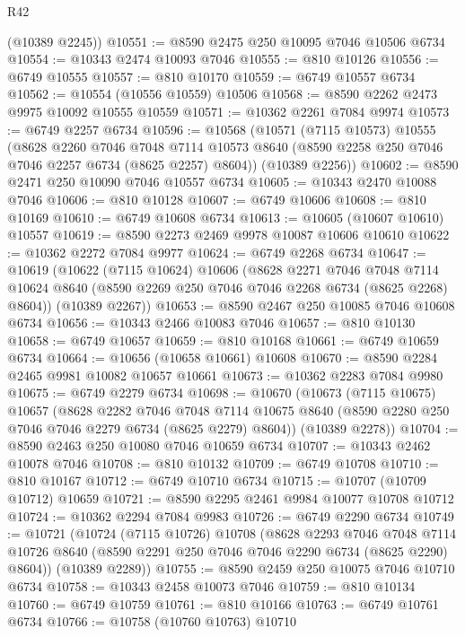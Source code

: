 \begin{lexlean}{R42}
\begin{coremodule}
{      (@10389 @2245))
@10551 := @8590 @2475 @250 @10095 @7046 @10506 @6734
@10554 := @10343 @2474 @10093 @7046
@10555 := @810 @10126
@10556 := @6749 @10555
@10557 := @810 @10170
@10559 := @6749 @10557 @6734
@10562 := @10554 (@10556 @10559) @10506
@10568 := @8590 @2262 @2473 @9975 @10092 @10555 @10559
@10571 := @10362 @2261 @7084 @9974
@10573 := @6749 @2257 @6734
@10596 := @10568
    (@10571
      (@7115 @10573)
      @10555
      (@8628
        @2260
        @7046
        @7048
        @7114
        @10573
        @8640
        (@8590 @2258 @250 @7046 @7046 @2257 @6734 (@8625 @2257) @8604))
      (@10389 @2256))
@10602 := @8590 @2471 @250 @10090 @7046 @10557 @6734
@10605 := @10343 @2470 @10088 @7046
@10606 := @810 @10128
@10607 := @6749 @10606
@10608 := @810 @10169
@10610 := @6749 @10608 @6734
@10613 := @10605 (@10607 @10610) @10557
@10619 := @8590 @2273 @2469 @9978 @10087 @10606 @10610
@10622 := @10362 @2272 @7084 @9977
@10624 := @6749 @2268 @6734
@10647 := @10619
    (@10622
      (@7115 @10624)
      @10606
      (@8628
        @2271
        @7046
        @7048
        @7114
        @10624
        @8640
        (@8590 @2269 @250 @7046 @7046 @2268 @6734 (@8625 @2268) @8604))
      (@10389 @2267))
@10653 := @8590 @2467 @250 @10085 @7046 @10608 @6734
@10656 := @10343 @2466 @10083 @7046
@10657 := @810 @10130
@10658 := @6749 @10657
@10659 := @810 @10168
@10661 := @6749 @10659 @6734
@10664 := @10656 (@10658 @10661) @10608
@10670 := @8590 @2284 @2465 @9981 @10082 @10657 @10661
@10673 := @10362 @2283 @7084 @9980
@10675 := @6749 @2279 @6734
@10698 := @10670
    (@10673
      (@7115 @10675)
      @10657
      (@8628
        @2282
        @7046
        @7048
        @7114
        @10675
        @8640
        (@8590 @2280 @250 @7046 @7046 @2279 @6734 (@8625 @2279) @8604))
      (@10389 @2278))
@10704 := @8590 @2463 @250 @10080 @7046 @10659 @6734
@10707 := @10343 @2462 @10078 @7046
@10708 := @810 @10132
@10709 := @6749 @10708
@10710 := @810 @10167
@10712 := @6749 @10710 @6734
@10715 := @10707 (@10709 @10712) @10659
@10721 := @8590 @2295 @2461 @9984 @10077 @10708 @10712
@10724 := @10362 @2294 @7084 @9983
@10726 := @6749 @2290 @6734
@10749 := @10721
    (@10724
      (@7115 @10726)
      @10708
      (@8628
        @2293
        @7046
        @7048
        @7114
        @10726
        @8640
        (@8590 @2291 @250 @7046 @7046 @2290 @6734 (@8625 @2290) @8604))
      (@10389 @2289))
@10755 := @8590 @2459 @250 @10075 @7046 @10710 @6734
@10758 := @10343 @2458 @10073 @7046
@10759 := @810 @10134
@10760 := @6749 @10759
@10761 := @810 @10166
@10763 := @6749 @10761 @6734
@10766 := @10758 (@10760 @10763) @10710
}
\end{coremodule}
\end{lexlean}
